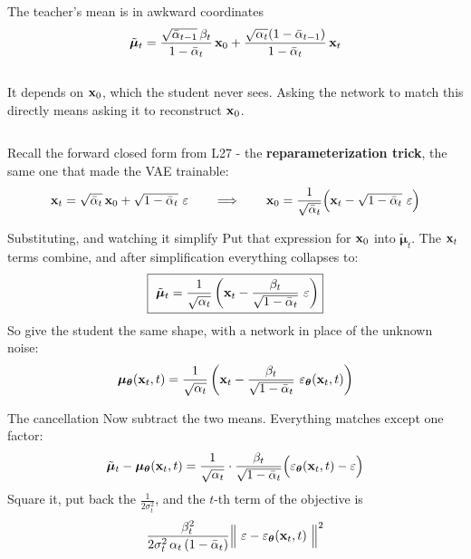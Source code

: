 \documentclass[aspectratio=169]{beamer}
\begin{document}
\begin{frame}{The teacher's mean is in awkward coordinates}
  \small
  \[
    \tilde{\bm\mu}_t = \frac{\sqrt{\bar\alpha_{t-1}}\,\beta_t}{1-\bar\alpha_t}\,\mathbf{x}_0
      + \frac{\sqrt{\alpha_t}(1-\bar\alpha_{t-1})}{1-\bar\alpha_t}\,\mathbf{x}_t
  \]
  \begin{columns}[T]
    It depends on $\mathbf{x}_0$, which the student never sees. Asking the network to match this
    directly means asking it to reconstruct $\mathbf{x}_0$.
  \end{columns}
  \vskip 8pt
  Recall the forward closed form from L27 - the \textbf{reparameterization trick}, the
  same one that made the VAE trainable:
  \[
    \mathbf{x}_t = \sqrt{\bar\alpha_t}\,\mathbf{x}_0 + \sqrt{1-\bar\alpha_t}\ \varepsilon
    \qquad\Longrightarrow\qquad
    \mathbf{x}_0 = \frac{1}{\sqrt{\bar\alpha_t}}\Big(\mathbf{x}_t - \sqrt{1-\bar\alpha_t}\ \varepsilon\Big)
  \]
\end{frame}

\begin{frame}{Substituting, and watching it simplify}
  \small
  Put that expression for $\mathbf{x}_0$ into $\tilde{\bm\mu}_t$. The $\mathbf{x}_t$ terms combine, and
  after simplification everything collapses to:
  \[
    \boxed{\ \tilde{\bm\mu}_t
      = \frac{1}{\sqrt{\alpha_t}}\left(\mathbf{x}_t - \frac{\beta_t}{\sqrt{1-\bar\alpha_t}}\ \varepsilon\right)}
  \]
  \vskip 4pt
  \vskip 6pt
  So give the student the same shape, with a network in place of the unknown noise:
  \[
    \bm\mu_{\thetav}(\xv_t,t)
      = \frac{1}{\sqrt{\alpha_t}}\left(\xv_t - \frac{\beta_t}{\sqrt{1-\bar\alpha_t}}\ \eps_{\thetav}(\xv_t,t)\right)
  \]
\end{frame}

\begin{frame}{The cancellation}
  \small
  Now subtract the two means. Everything matches except one factor:
  \[
    \tilde{\bm\mu}_t - \bm\mu_{\bm{\theta}}(\mathbf{x}_t,t)
    = \frac{1}{\sqrt{\alpha_t}}\cdot\frac{\beta_t}{\sqrt{1-\bar\alpha_t}}
      \Big(\varepsilon_{\bm{\theta}}(\mathbf{x}_t,t) - \varepsilon\Big)
  \]
  \vskip -2pt
  Square it, put back the $\tfrac{1}{2\sigma_t^2}$, and the $t$-th term of the objective is
  \[
    \frac{\beta_t^{2}}{2\sigma_t^{2}\,\alpha_t\,(1-\bar\alpha_t)}
    \Big\|\ \varepsilon - \varepsilon_{\bm{\theta}}(\mathbf{x}_t,t)\ \Big\|^{2}
  \]
  \vskip 4pt
\end{frame}
\end{document}
